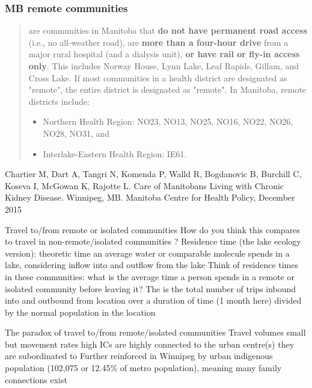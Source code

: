 \documentclass[aspectratio=169]{beamer}\usepackage[]{graphicx}\usepackage[]{xcolor}
\begin{document}
\begin{frame}\frametitle{MB remote communities}
  \begin{quote}
   are communities in Manitoba that \textbf{do not have permanent road access} (i.e., no all-weather road), are \textbf{more than a four-hour drive} from a major rural hospital (and a dialysis unit), \textbf{or have rail or fly-in access only}. This includes Norway House, Lynn Lake, Leaf Rapids, Gillam, and Cross Lake. If most communities in a health district are designated as "remote", the entire district is designated as "remote". In Manitoba, remote districts include:
  \begin{itemize}
  \item Northern Health Region: NO23, NO13, NO25, NO16, NO22, NO26, NO28, NO31, and
  \item Interlake-Eastern Health Region: IE61.
  \end{itemize}
  \end{quote}
  \vfill
  \small
  Chartier M, Dart A, Tangri N, Komenda P, Walld R, Bogdanovic B, Burchill C, Koseva I, McGowan K, Rajotte L. Care of Manitobans Living with Chronic Kidney Disease. Winnipeg, MB.
  Manitoba Centre for Health Policy, December 2015
\end{frame}


\begin{frame}{Travel to/from remote or isolated communities}
  How do you think this compares to travel in non-remote/isolated communities ?
  \vfill
  Residence time (the lake ecology version): theoretic time an average water or comparable molecule spends in a lake, considering inflow into and outflow from the lake
  \vfill
  Think of residence times in these communities: what is the average time a person spends in a remote or isolated community before leaving it?
  \vfill
  The  is the total number of trips inbound into and outbound from location over a duration of time (1 month here) divided by the normal population in the location 
\end{frame}


\begin{frame}{The paradox of travel to/from remote/isolated communities}
Travel volumes small but movement rates high
\vfill
ICs are highly connected to the urban centre(s) they are subordinated to
\vfill
Further reinforced in Winnipeg by urban indigenous population (102,075 or 12.45\% of metro population), meaning many family connections exist
\end{frame}
\end{document}
